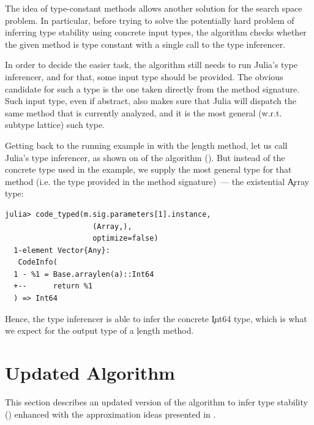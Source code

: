 The idea of type-constant methods allows another solution for the search space
problem. In particular, before trying to solve the potentially hard problem of
inferring type stability using concrete input types,
the algorithm checks whether the given method is
type constant with a single call to the type inferencer.


In order to decide the easier task, the algorithm still needs to run Julia's
type inferencer, and for that, some input type should be provided. The obvious
candidate for such a type is the one taken directly from the method signature.
Such input type, even if abstract, also makes sure that Julia will dispatch the
same method that is currently analyzed, and it is the most general (w.r.t.
subtype lattice) such type.

Getting back to the running example in  with the
\c{length} method, let us call Julia's type inferencer, as
shown on  of the algorithm (). But
instead of the concrete type used in the example, we supply the most general type
for that method (i.e. the type provided in the method signature)~--- the
existential \c{Array} type:
\begin{lstlisting}[style=jterm]
  julia> code_typed(m.sig.parameters[1].instance,
                    (Array,),
                    optimize=false)
  1-element Vector{Any}:
   CodeInfo(
  1 - %1 = Base.arraylen(a)::Int64
  +--      return %1
  ) => Int64
\end{lstlisting}
Hence, the type inferencer is able to infer the concrete \c{Int64} type, which
is what we expect for the output type of a \c{length} method.

\section{Updated Algorithm} %
\label{sec:approx:algo-final}

This section describes an updated version of the algorithm to infer type
stability () enhanced with the approximation ideas
presented in .


